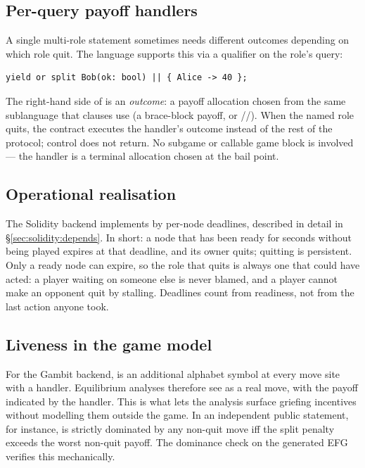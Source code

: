 \subsection{Per-query payoff handlers}
\label{sec:liveness:per-query}

A single multi-role statement sometimes needs different outcomes
depending on which role quit.  The language supports this via a
\TT{||} qualifier on the role's query:

\begin{lstlisting}[style=vg]
yield or split Bob(ok: bool) || { Alice -> 40 };
\end{lstlisting}

The right-hand side of \TT{||} is an \emph{outcome}: a payoff
allocation chosen from the same sublanguage that 
clauses use (a brace-block payoff, or //).
When the named role quits, the contract executes the handler's
outcome instead of the rest of the protocol; control does
not return.  No subgame or callable game block is involved ---
the handler is a terminal allocation chosen at the bail point.

\subsection{Operational realisation}

The Solidity backend implements  by per-node deadlines,
described in detail in \S\ref{sec:solidity:depends}.  In short: a
node that has been ready for  seconds without being
played expires at that deadline, and its owner quits; quitting is
persistent.  Only a ready node can expire, so the role that quits is
always one that could have acted: a player waiting on someone else
is never blamed, and a player cannot make an opponent quit by
stalling.  Deadlines count from readiness, not from the last action
anyone took.

\subsection{Liveness in the game model}

For the Gambit backend,  is an additional alphabet
symbol at every move site with a handler.  Equilibrium analyses
therefore see  as a real move, with the payoff indicated
by the handler.  This is what lets the analysis surface griefing
incentives without modelling them outside the game.  In an
independent public  statement, for instance,
 is strictly dominated by any non-quit move iff the
split penalty exceeds the worst non-quit payoff.  The dominance
check on the generated EFG verifies this mechanically.


